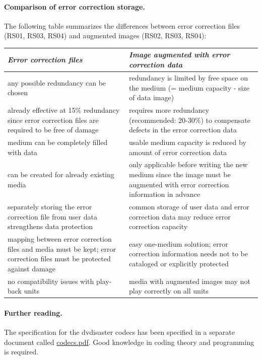 \newpage

\paragraph{Comparison of error correction storage.} The following table summarizes the differences 
between error correction files (RS01, RS03, RS04) and augmented images (RS02, RS03, RS04):

\smallskip

\begin{tabular}{|p{}|p{}|}
\hline
{\em Error correction files} 	& 
{\em Image augmented with error correction data} \\
\hline
any possible redundancy can be chosen &	
redundancy is limited by free space on the medium (= medium capacity - size of data image) \\
\hline
already effective at 15\% redundancy since error correction files are required to be free of damage &
requires more redundancy (recommended: 20-30\%) to compensate defects in the error correction data \\
\hline
medium can be completely filled with data  &
usable medium capacity is reduced by amount of error correction data \\
\hline
can be created for already existing media & 
only applicable before writing the new medium since the image must be augmented with error correction information in advance \\
\hline
separately storing the error correction file from user data strengthens data protection &
common storage of user data and error correction data may reduce error correction capacity \\
\hline
mapping between error correction files and media must be kept; error correction files must be 
protected against damage &
easy one-medium solution; error correction information needs not to be cataloged or explicitly protected \\
\hline
no compatibility issues with play-back units &
media with augmented images may not play correctly on all units \\
\hline
\end{tabular}

\paragraph{Further reading.} The specification for the dvdisaster codecs 
has been specified in a separate document called \href{https://web.archive.org/web/20180428070843/http://dvdisaster.net/downloads/codecs.pdf}{codecs.pdf}. 
Good knowledge in coding theory and programming is required.


